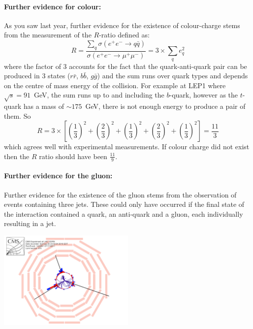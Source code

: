 \paragraph{Further evidence for colour:}
As you saw last year, further evidence for the existence of colour-charge stems from the measurement of the $R$-ratio defined as:
\[
R=\frac{\sum_q\sigma(e^+e^-\to q\bar{q})}{\sigma(e^+e^-\to\mu^+\mu^-)}=3\times\sum_q e_{q}^{2}
\]
where the factor of 3 accounts for the fact that the quark-anti-quark pair can be produced in 3 states ($r\bar{r}$, $b\bar{b}$, $g\bar{g}$) and the sum runs over quark types and depends on the centre of mass energy of the collision. For example at LEP1 where $\sqrt{s}=91$~GeV, the sum runs up to and including the $b$-quark, however as the $t$-quark has a mass of $\sim 175$~GeV, there is not enough energy to produce a pair of them. So 
\[
R=3\times\left[\left(\frac{1}{3}\right)^2+\left(\frac{2}{3}\right)^2+\left(\frac{1}{3}\right)^2+\left(\frac{2}{3}\right)^2+\left(\frac{1}{3}\right)^2\right]=\frac{11}{3}
\]
which agrees well with experimental measurements. If colour charge did not exist then the $R$ ratio should have been $\frac{11}{9}$.

\paragraph{Further evidence for the gluon:}
Further evidence for the existence of the gluon stems from the observation of events containing three jets. These could only have occurred if the final state of the interaction contained a quark, an anti-quark and a gluon, each individually resulting in a jet.
\begin{center}
\includegraphics[width=0.5\textwidth]{fig/strongforce/cms_trijet.png}
\end{center}




